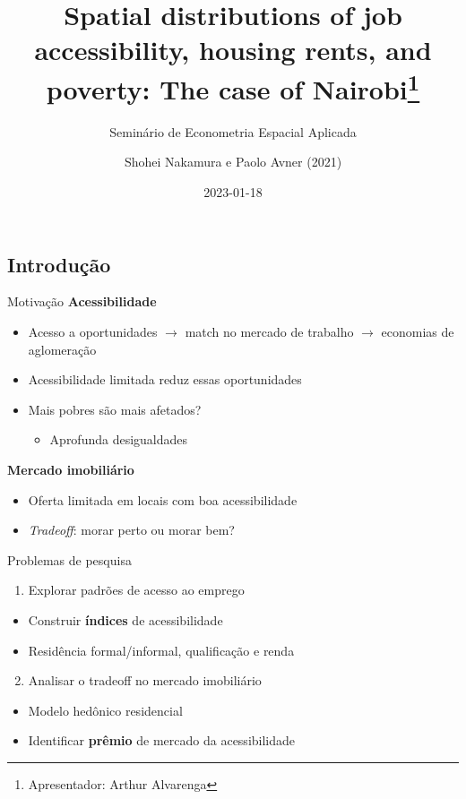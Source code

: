 \documentclass[
  ignorenonframetext,
  aspectratio=169]{beamer}
\title{Spatial distributions of job accessibility, housing rents, and
poverty: The case of Nairobi\thanks{Apresentador: Arthur Alvarenga}}
\subtitle{Seminário de Econometria Espacial Aplicada}
\author{Shohei Nakamura e Paolo Avner (2021)}
\date{2023-01-18}
\providecommand{\tightlist}{%
  \setlength{\itemsep}{0pt}\setlength{\parskip}{0pt}}
\begin{document}
\frame{\titlepage}

\hypertarget{introduuxe7uxe3o}{%
\subsection{Introdução}\label{introduuxe7uxe3o}}

\begin{frame}{Motivação}
\protect\hypertarget{motivauxe7uxe3o}{}
\textbf{Acessibilidade}

\begin{itemize}
\tightlist
\item
  Acesso a oportunidades \(\rightarrow\) match no mercado de trabalho
  \(\rightarrow\) economias de aglomeração
\item
  Acessibilidade limitada reduz essas oportunidades
\item
  Mais pobres são mais afetados?

  \begin{itemize}
  \tightlist
  \item
    Aprofunda desigualdades
  \end{itemize}
\end{itemize}

\textbf{Mercado imobiliário}

\begin{itemize}
\tightlist
\item
  Oferta limitada em locais com boa acessibilidade
\item
  \emph{Tradeoff}: morar perto ou morar bem?
\end{itemize}
\end{frame}

\begin{frame}{Problemas de pesquisa}
\protect\hypertarget{problemas-de-pesquisa}{}
\begin{enumerate}
\tightlist
\item
  Explorar padrões de acesso ao emprego
\end{enumerate}

\begin{itemize}
\tightlist
\item
  Construir \textbf{índices} de acessibilidade
\item
  Residência formal/informal, qualificação e renda
\end{itemize}

\begin{enumerate}
\setcounter{enumi}{1}
\tightlist
\item
  Analisar o tradeoff no mercado imobiliário
\end{enumerate}

\begin{itemize}
\tightlist
\item
  Modelo hedônico residencial
\item
  Identificar \textbf{prêmio} de mercado da acessibilidade
\end{itemize}
\end{frame}
\end{document}
